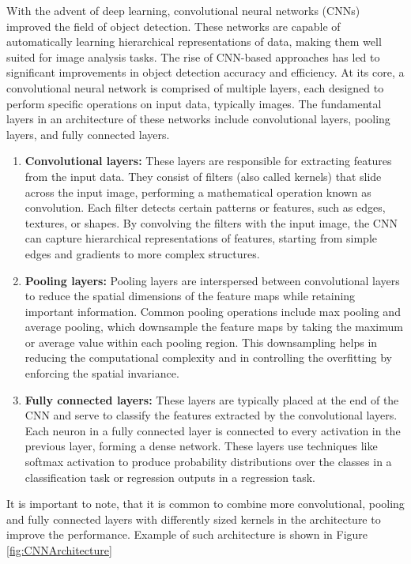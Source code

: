 With the advent of deep learning, convolutional neural networks (CNNs) improved the field of object detection. These
networks are
capable of automatically learning \linebreak hierarchical representations of data, making them well suited for image analysis
tasks. The rise of CNN-based approaches has led to significant improvements in object detection accuracy and efficiency.
At its core, a convolutional neural network is comprised of multiple layers, each designed to perform specific
operations on input data, typically images. The fundamental layers in an architecture of these networks include convolutional layers,
pooling layers, and fully connected layers.
\begin{enumerate}
  \item \textbf{Convolutional layers:} These layers are responsible for extracting features from the input data. They consist of filters (also called kernels) that slide across the input image, performing a mathematical operation known as convolution. Each filter detects certain patterns or features, such as edges, textures, or shapes. By convolving the filters with the input image, the CNN can capture hierarchical representations of features, starting from simple edges and gradients to more complex structures.
  \item \textbf{Pooling layers:} Pooling layers are interspersed between convolutional layers to reduce the spatial dimensions of the feature maps while retaining important information. Common pooling operations include max pooling and average pooling, which downsample the feature maps by taking the maximum or average value within each pooling region. This downsampling helps in reducing the computational complexity and in controlling the overfitting by enforcing the spatial invariance.
  \item \textbf{Fully connected layers:} These layers are typically placed at the end of the CNN and serve to classify the features extracted by the convolutional layers. Each neuron in \linebreak a fully connected layer is connected to every activation in the previous layer, forming a dense network. These layers use techniques like softmax activation to produce probability distributions over the classes in a classification task or regression outputs in a regression task.
\end{enumerate}
It is important to note, that it is common to combine more convolutional, pooling and fully connected layers with differently sized kernels in the architecture to improve the performance. Example of such architecture is shown in Figure \ref{fig:CNNArchitecture}
